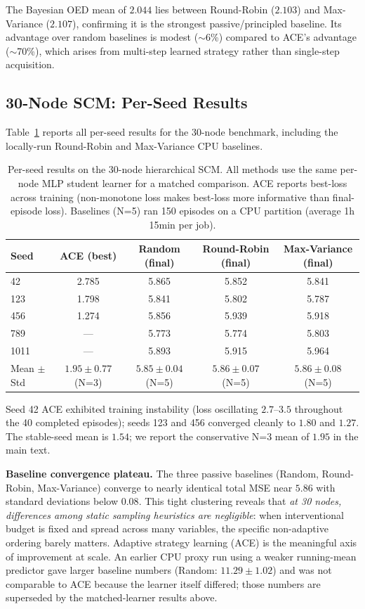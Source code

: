 \documentclass[twoside]{article}
\theoremstyle{plain}
\theoremstyle{definition}
\theoremstyle{remark}
\begin{document}
The Bayesian OED mean of $2.044$ lies between Round-Robin ($2.103$) and Max-Variance ($2.107$), confirming it is the strongest passive/principled baseline. Its advantage over random baselines is modest ($\sim$6\%) compared to ACE's advantage ($\sim$70\%), which arises from multi-step learned strategy rather than single-step acquisition.

\subsection{30-Node SCM: Per-Seed Results}
\label{app:30node-detail}

Table~\ref{tab:30node-perseed} reports all per-seed results for the 30-node benchmark, including the locally-run Round-Robin and Max-Variance CPU baselines.

\begin{table}[h]
\centering
\caption{Per-seed results on the 30-node hierarchical SCM. All methods use the same per-node MLP student learner for a matched comparison. ACE reports best-loss across training (non-monotone loss makes best-loss more informative than final-episode loss). Baselines (N=5) ran 150 episodes on a CPU partition (average 1h 15min per job).}
\label{tab:30node-perseed}
\small
\begin{tabular}{@{}l cccc@{}}
\toprule
Seed & ACE (best) & Random (final) & Round-Robin (final) & Max-Variance (final) \\
\midrule
42   & 2.785 & 5.865 & 5.852 & 5.841 \\
123  & 1.798 & 5.841 & 5.802 & 5.787 \\
456  & 1.274 & 5.856 & 5.939 & 5.918 \\
789  & ---   & 5.773 & 5.774 & 5.803 \\
1011 & ---   & 5.893 & 5.915 & 5.964 \\
\midrule
Mean $\pm$ Std & $1.95\pm0.77$ (N=3) & $5.85\pm0.04$ (N=5) & $5.86\pm0.07$ (N=5) & $5.86\pm0.08$ (N=5) \\
\bottomrule
\end{tabular}
\end{table}

Seed 42 ACE exhibited training instability (loss oscillating $2.7$--$3.5$ throughout the 40 completed episodes); seeds 123 and 456 converged cleanly to $1.80$ and $1.27$. The stable-seed mean is $1.54$; we report the conservative N=3 mean of $1.95$ in the main text.

\textbf{Baseline convergence plateau.} The three passive baselines (Random, Round-Robin, Max-Variance) converge to nearly identical total MSE near $5.86$ with standard deviations below $0.08$. This tight clustering reveals that \emph{at 30 nodes, differences among static sampling heuristics are negligible}: when interventional budget is fixed and spread across many variables, the specific non-adaptive ordering barely matters. Adaptive strategy learning (ACE) is the meaningful axis of improvement at scale. An earlier CPU proxy run using a weaker running-mean predictor gave larger baseline numbers (Random: $11.29\pm1.02$) and was not comparable to ACE because the learner itself differed; those numbers are superseded by the matched-learner results above.
\end{document}
